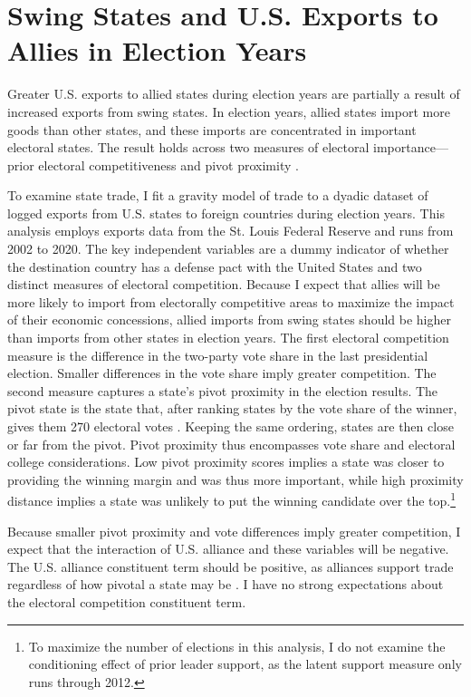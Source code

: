 \documentclass[12pt]{article}
\begin{document}
\section{Swing States and U.S. Exports to Allies in Election Years}


Greater U.S. exports to allied states during election years are partially a result of increased exports from swing states.
In election years, allied states import more goods than other states, and these imports are concentrated in important electoral states.
The result holds across two measures of electoral importance--- prior electoral competitiveness and pivot proximity \citep{Wright2009}.


To examine state trade, I fit a gravity model of trade to a dyadic dataset of logged exports from U.S. states to foreign countries during election years.
This analysis employs exports data from the St. Louis Federal Reserve and runs from 2002 to 2020.
The key independent variables are a dummy indicator of whether the destination country has a defense pact with the United States and two distinct measures of electoral competition. 
Because I expect that allies will be more likely to import from electorally competitive areas to maximize the impact of their economic concessions, allied imports from swing states should be higher than imports from other states in election years. 
The first electoral competition measure is the difference in the two-party vote share in the last presidential election.
Smaller differences in the vote share imply greater competition.
The second measure captures a state's pivot proximity in the election results. 
The pivot state is the state that, after ranking states by the vote share of the winner, gives them 270 electoral votes \citep{Wright2009}.
Keeping the same ordering, states are then close or far from the pivot. 
Pivot proximity thus encompasses vote share and electoral college considerations. 
Low pivot proximity scores implies a state was closer to providing the winning margin and was thus more important, while high proximity distance implies a state was unlikely to put the winning candidate over the top.\footnote{To maximize the number of elections in this analysis, I do not examine the conditioning effect of prior leader support, as the latent support measure only runs through 2012.} 


Because smaller pivot proximity and vote differences imply greater competition, I expect that the interaction of U.S. alliance and these variables will be negative. 
The U.S. alliance constituent term should be positive, as alliances support trade regardless of how pivotal a state may be \citep{GowaMansfield2004, Fordham2010}. 
I have no strong expectations about the electoral competition constituent term.
\end{document}
